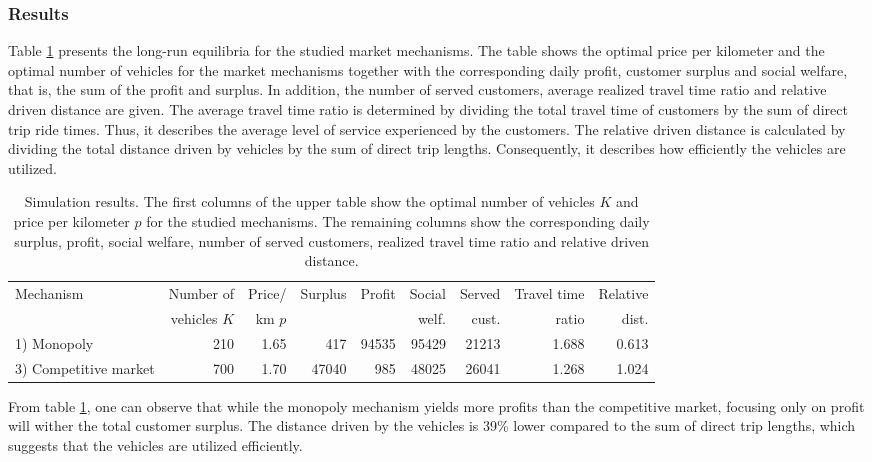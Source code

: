 \documentclass[dissertation,draft*]{aaltoseries}
\begin{document}
\subsubsection{Results}
Table \ref{tulokset} presents the long-run equilibria for the studied market mechanisms. The table shows the optimal price per kilometer and the optimal number of vehicles for the market mechanisms together with the corresponding daily profit, customer surplus and social welfare, that is, the sum of the profit and surplus. In addition, the number of served customers, average realized travel time ratio and relative driven distance are given. The average travel time ratio is determined by dividing the total travel time of customers by the sum of direct trip ride times. Thus, it describes the average level of service experienced by the customers. The relative driven distance is calculated by dividing the total distance driven by vehicles by the sum of direct trip lengths. Consequently, it describes how efficiently the vehicles are utilized. 

\begin{table}
\centering
{\scriptsize
\begin{tabular}{|lrrrrrrrr|}
\hline
Mechanism & Number of &	Price/ & Surplus	& Profit	& Social & Served & Travel time& Relative \\
& vehicles $K$ &  km $p$ & & & welf. & cust. & ratio & dist. \\
\hline
1) Monopoly	                & 210	& 1.65	& 417	  & 94535	& 95429 & 21213	& 1.688	& 0.613 \\
3) Competitive market 	    & 700	& 1.70	& 47040	&  985	& 48025	& 26041	& 1.268	& 1.024 \\
\hline
\end{tabular}
}
\caption{Simulation results. The first columns of the upper table show the 
optimal number of vehicles $K$ and price per kilometer $p$ for the studied mechanisms. The remaining
columns show the corresponding daily surplus, profit, social welfare, 
number of served customers, realized travel time ratio and relative driven distance.}
\label{tulokset}
\end{table}

From table \ref{tulokset}, one can observe that while the monopoly mechanism yields more profits than the competitive market, focusing only on profit will wither the total customer surplus. The distance driven by the vehicles is 39\% lower compared to
the sum of direct trip lengths, which suggests that the vehicles are utilized efficiently.
\end{document}
